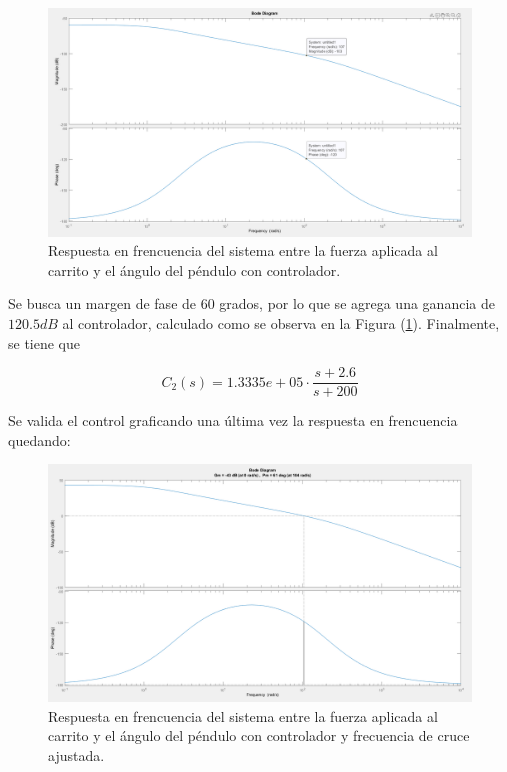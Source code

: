 \begin{figure}[H]
	\centering
	\includegraphics[width=0.8\linewidth]{Imagenes/loopshaping/bode_cerrando_q_con_controlador}
	\caption{Respuesta en frencuencia del sistema entre la fuerza aplicada al carrito y el ángulo del péndulo con controlador.}
	\label{bode_cerrando_q_con_controlador}
\end{figure}

Se busca un margen de fase de $60$ grados, por lo que se agrega una ganancia de $120.5 dB$ al controlador, calculado como se observa en la Figura (\ref{bode_cerrando_q_con_controlador}). Finalmente, se tiene que

\begin{equation}
C_2(s) = 1.3335e+05 \cdot \frac{s+2.6}{s+200}
\end{equation}

Se valida el control graficando una última vez la respuesta en frencuencia quedando:

\begin{figure}[H]
	\centering
	\includegraphics[width=0.8\linewidth]{Imagenes/loopshaping/bode_cerrando_q_con_controlador_ganancia}
	\caption{Respuesta en frencuencia del sistema entre la fuerza aplicada al carrito y el ángulo del péndulo con controlador y frecuencia de cruce ajustada.}
	\label{bode_cerrando_q_con_controlador_ganancia}
\end{figure}

